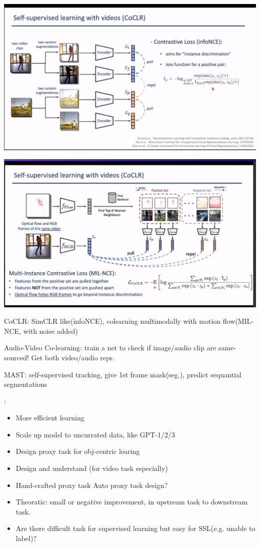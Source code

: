 \documentclass{article}
\begin{document}
    \centerline{\includegraphics[width=0.8\paperwidth]{coclr.PNG}}
    \centerline{\includegraphics[width=0.8\paperwidth]{coclr2.PNG}}
    CoCLR: SimCLR like(infoNCE), colearning multimodally with motion flow(MIL-NCE, with noise added)

    Audio-Video Co-learning: train a net to check if image/audio clip are same-sourced! Get both video/audio repr.

    MAST: self-supervised tracking, give 1st frame mask(seg.), predict sequantial segmentations

    :
    \begin{itemize}
        \item More efficient learning
        \item Scale up model to uncurrated data, like GPT-1/2/3
        \item Design proxy task for obj-centric learing
        \item Design and understand (for video task especially)
        \item Hand-crafted proxy task \trarr Auto proxy task design?
        \item Theoratic: small or negative improvement, in upstream task to downstream task.
        \item Are there difficult task for supervised learning but easy for SSL(e.g. unable to label)?
    \end{itemize}
\end{document}
